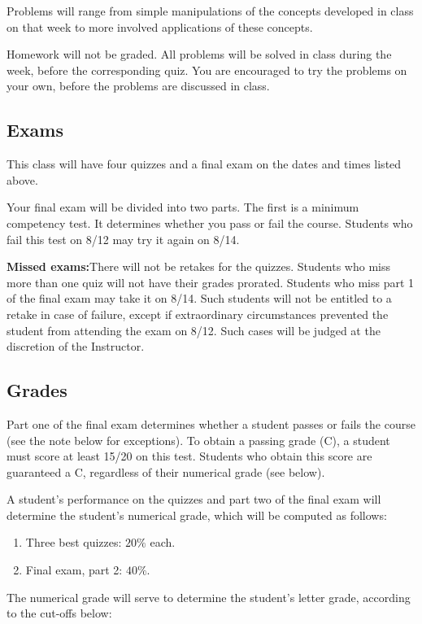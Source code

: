 \documentclass[11pt]{amsart}
\numberwithin{equation}{section}
\begin{document}
Problems will range from simple manipulations of the concepts developed in class on that week to more involved applications of these concepts.
    
Homework will not be graded. All problems will be solved in class during the week, before the corresponding quiz. You are encouraged to try the problems on your own, before the problems are discussed in class.

\subsection{Exams}
This class will have four quizzes and a final exam on the dates and times listed above.

Your final exam will be divided into two parts. The first is a minimum competency test. It determines whether you pass or fail the course. Students who fail this test on 8/12 may try it again on 8/14.

\textbf{Missed exams:}There will not be retakes for the quizzes. Students who miss more than one quiz will not have their grades prorated. Students who miss part 1 of the final exam may take it on 8/14. Such students will not be entitled to a retake in case of failure, except if extraordinary circumstances prevented the student from attending the exam on 8/12. Such cases will be judged at the discretion of the
Instructor.
\subsection{Grades}
Part one of the final exam determines whether a student passes or fails the course (see the note below for exceptions). To obtain a passing grade (C), a student must score at least 15/20 on this test. Students who obtain this score are guaranteed a C, regardless of their numerical grade (see below).

A student's performance on the quizzes and part two of the final exam will determine the student's numerical grade, which will be computed as follows:
\begin{enumerate}
\item Three best quizzes: $20\% $ each.
\item Final exam, part 2: $40\% $.
\end{enumerate}

The numerical grade will serve to determine the student's letter grade, according to the cut-offs below: 
\end{document}
